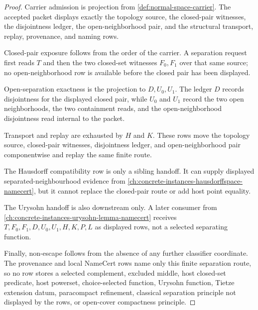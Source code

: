 \begin{proof}
Carrier admission is projection from \autoref{def:normal-space-carrier}. The accepted packet displays exactly the topology source, the closed-pair witnesses, the disjointness ledger, the open-neighborhood pair, and the structural transport, replay, provenance, and naming rows.

Closed-pair exposure follows from the order of the carrier. A separation request first reads $T$ and then the two closed-set witnesses $F_0,F_1$ over that same source; no open-neighborhood row is available before the closed pair has been displayed.

Open-separation exactness is the projection to $D,U_0,U_1$. The ledger $D$ records disjointness for the displayed closed pair, while $U_0$ and $U_1$ record the two open neighborhoods, the two containment reads, and the open-neighborhood disjointness read internal to the packet.

Transport and replay are exhausted by $H$ and $K$. These rows move the topology source, closed-pair witnesses, disjointness ledger, and open-neighborhood pair componentwise and replay the same finite route.

The Hausdorff compatibility row is only a sibling handoff. It can supply displayed separated-neighbourhood evidence from \autoref{ch:concrete-instances-hausdorffspace-namecert}, but it cannot replace the closed-pair route or add host point equality.

The Urysohn handoff is also downstream only. A later consumer from \autoref{ch:concrete-instances-urysohn-lemma-namecert} receives $T,F_0,F_1,D,U_0,U_1,H,K,P,L$ as displayed rows, not a selected separating function.

Finally, non-escape follows from the absence of any further classifier coordinate. The provenance and local NameCert rows name only this finite separation route, so no row stores a selected complement, excluded middle, host closed-set predicate, host powerset, choice-selected function, Urysohn function, Tietze extension datum, paracompact refinement, classical separation principle not displayed by the rows, or open-cover compactness principle.
\end{proof}


